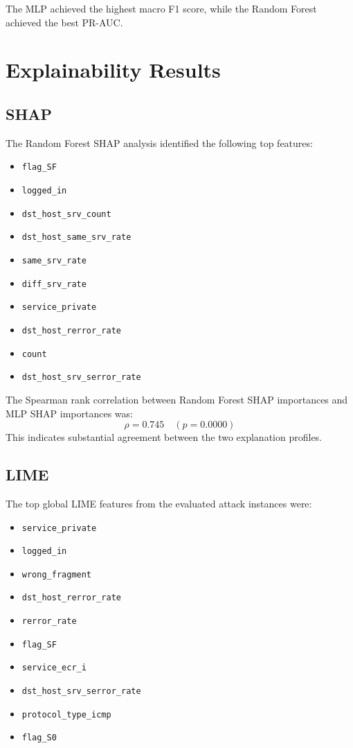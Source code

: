 \documentclass[11pt]{article}
\begin{document}
\noindent The MLP achieved the highest macro F1 score, while the Random Forest achieved the best PR-AUC.

\section{Explainability Results}
\subsection{SHAP}
The Random Forest SHAP analysis identified the following top features:
\begin{itemize}[leftmargin=*]
    \item \texttt{flag\_SF}
    \item \texttt{logged\_in}
    \item \texttt{dst\_host\_srv\_count}
    \item \texttt{dst\_host\_same\_srv\_rate}
    \item \texttt{same\_srv\_rate}
    \item \texttt{diff\_srv\_rate}
    \item \texttt{service\_private}
    \item \texttt{dst\_host\_rerror\_rate}
    \item \texttt{count}
    \item \texttt{dst\_host\_srv\_serror\_rate}
\end{itemize}

The Spearman rank correlation between Random Forest SHAP importances and MLP SHAP importances was:
\[
\rho = 0.745 \quad (p = 0.0000)
\]
This indicates substantial agreement between the two explanation profiles.

\subsection{LIME}
The top global LIME features from the evaluated attack instances were:
\begin{itemize}[leftmargin=*]
    \item \texttt{service\_private}
    \item \texttt{logged\_in}
    \item \texttt{wrong\_fragment}
    \item \texttt{dst\_host\_rerror\_rate}
    \item \texttt{rerror\_rate}
    \item \texttt{flag\_SF}
    \item \texttt{service\_ecr\_i}
    \item \texttt{dst\_host\_srv\_serror\_rate}
    \item \texttt{protocol\_type\_icmp}
    \item \texttt{flag\_S0}
\end{itemize}
\end{document}
